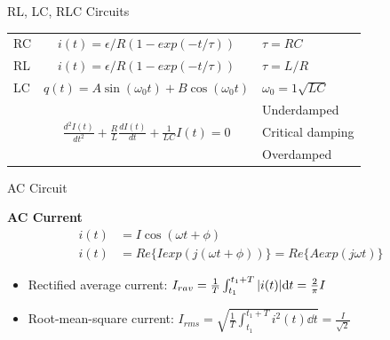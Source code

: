 \documentclass[9pt]{beamer}
\begin{document}
\begin{frame}{RL, LC, RLC Circuits}
    \begin{table}[htbp]
        \centering
        \begin{tabular}{l c l}
            \toprule
            RC & $i(t)=\epsilon/R(1-exp(-t/\tau))$ & $\tau=RC$ \\ \addlinespace[1em]
            RL & $i(t)=\epsilon/R(1-exp(-t/\tau))$ & $\tau=L/R$ \\ \addlinespace[1em] 
            LC & $q(t) = A\sin(\omega_0 t) + B\cos(\omega_0 t)$ & $\omega_0 = 1\sqrt{LC}$\\ \addlinespace[1em]
            \multirow{3}{*}{RLC} & \multirow{3}{*}{$\frac{d^{2} I(t)}{d t^{2}}+\frac{R}{L} \frac{d I(t)}{d t}+\frac{1}{L C} I(t)=0$} & Underdamped \\ 
            &&Critical damping \\
            &&Overdamped \\
            \bottomrule
        \end{tabular}
    \end{table}
\end{frame}

\begin{frame}{AC Circuit}
    \begin{beamerboxesrounded}[shadow=true]{\bf AC Current}
        \begin{align}
            i(t) &= I\cos(\omega t + \phi) \\
            i(t) &= \mathit{Re}\{ I exp(j(\omega t + \phi))\} = \mathit{Re}\{ A exp(j\omega t)\}
        \end{align}
    \end{beamerboxesrounded}
    \vspace{.5em}
    \begin{itemize}
        \item Rectified average current: $I_{rav} = \frac{1}{T}\int_{t_1}^{t_1+T}\abs{i(t)}\dd t = \frac{2}{\pi}I$
        \item Root-mean-square current: $I_{rms} = \sqrt{\frac{1}{T}\int_{t_1}^{t_1+T}i^2(t)\dd t} = \frac{I}{\sqrt{2}}$
    \end{itemize}
\end{frame}
\end{document}
